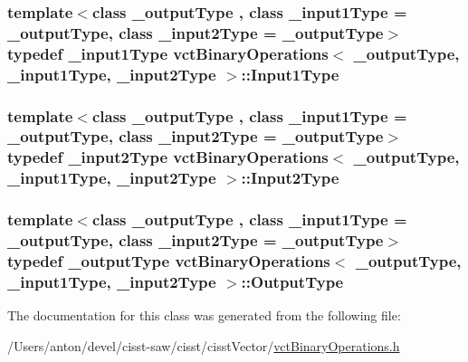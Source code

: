 \subsubsection[{Input1\+Type}]{\setlength{\rightskip}{0pt plus 5cm}template$<$class \+\_\+output\+Type , class \+\_\+input1\+Type  = \+\_\+output\+Type, class \+\_\+input2\+Type  = \+\_\+output\+Type$>$ typedef \+\_\+input1\+Type {\bf vct\+Binary\+Operations}$<$ \+\_\+output\+Type, \+\_\+input1\+Type, \+\_\+input2\+Type $>$\+::{\bf Input1\+Type}}\label{classvct_binary_operations_a5e56a66a012d6a28c539a08a0021c45e}
\hypertarget{classvct_binary_operations_a929119af557a04a16b4d854981e49e1b}{}
\subsubsection[{Input2\+Type}]{\setlength{\rightskip}{0pt plus 5cm}template$<$class \+\_\+output\+Type , class \+\_\+input1\+Type  = \+\_\+output\+Type, class \+\_\+input2\+Type  = \+\_\+output\+Type$>$ typedef \+\_\+input2\+Type {\bf vct\+Binary\+Operations}$<$ \+\_\+output\+Type, \+\_\+input1\+Type, \+\_\+input2\+Type $>$\+::{\bf Input2\+Type}}\label{classvct_binary_operations_a929119af557a04a16b4d854981e49e1b}
\hypertarget{classvct_binary_operations_afbfa2d453460e6ab5b67c26e2d3fc4b1}{}
\subsubsection[{Output\+Type}]{\setlength{\rightskip}{0pt plus 5cm}template$<$class \+\_\+output\+Type , class \+\_\+input1\+Type  = \+\_\+output\+Type, class \+\_\+input2\+Type  = \+\_\+output\+Type$>$ typedef \+\_\+output\+Type {\bf vct\+Binary\+Operations}$<$ \+\_\+output\+Type, \+\_\+input1\+Type, \+\_\+input2\+Type $>$\+::{\bf Output\+Type}}\label{classvct_binary_operations_afbfa2d453460e6ab5b67c26e2d3fc4b1}


The documentation for this class was generated from the following file\+:\begin{DoxyCompactItemize}
\item 
/\+Users/anton/devel/cisst-\/saw/cisst/cisst\+Vector/\hyperlink{vct_binary_operations_8h}{vct\+Binary\+Operations.\+h}\end{DoxyCompactItemize}
